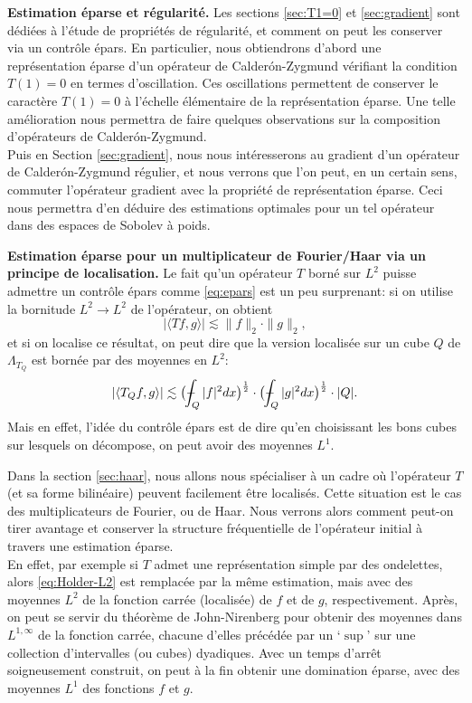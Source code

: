 \documentclass[11pt]{amsart}
\def\Xint#1{\mathchoice
   {\XXint\displaystyle\textstyle{#1}}%
   {\XXint\textstyle\scriptstyle{#1}}%
   {\XXint\scriptstyle\scriptscriptstyle{#1}}%
   {\XXint\scriptscriptstyle\scriptscriptstyle{#1}}%
   \!\int}
\def\XXint#1#2#3{{\setbox0=\hbox{$#1{#2#3}{\int}$}
     \vcenter{\hbox{$#2#3$}}\kern-.5\wd0}}
\def\aver#1{\Xint-_{#1}}
\begin{document}
\medskip

\large{ \bf Estimation \'eparse et r\'egularit\'e.}
Les sections \ref{sec:T1=0} et \ref{sec:gradient} sont d\'edi\'ees \`a l'\'etude de propri\'et\'es de r\'egularit\'e, et comment on peut les conserver via un contr\^ole \'epars. En particulier, nous obtiendrons d'abord une repr\'esentation \'eparse d'un op\'erateur de Calder\'on-Zygmund v\'erifiant la condition $T(1)=0$ en termes d'oscillation. Ces oscillations permettent de conserver le caract\`ere $T(1)=0$ \`a l'\'echelle \'el\'ementaire de la repr\'esentation \'eparse. Une telle am\'elioration nous permettra de faire quelques observations sur la composition d'op\'erateurs de Calder\'on-Zygmund. \\
Puis en Section \ref{sec:gradient}, nous nous int\'eresserons au gradient d'un op\'erateur de Calder\'on-Zygmund r\'egulier, et nous verrons que l'on peut, en un certain sens, commuter l'op\'erateur gradient avec la propri\'et\'e de repr\'esentation \'eparse. Ceci nous permettra d'en d\'eduire des estimations optimales pour un tel op\'erateur dans des espaces de Sobolev \`a poids.

\medskip

\large{ \bf Estimation \'eparse pour un multiplicateur de Fourier/Haar via un principe de localisation.}
Le fait qu'un op\'erateur $T$ born\'e sur $L^2$ puisse admettre un contr\^ole \'epars comme \eqref{eq:epars} est un peu surprenant: si on utilise la bornitude $L^2 \to L^2$ de l'op\'erateur, on  obtient
\[
\vert \langle T f, g  \rangle \vert \lesssim \|f\|_2 \cdot \|g\|_2,
\] 
et si on localise ce r\'esultat, on peut dire que la version localis\'ee sur un cube $Q$ de $\Lambda_{T_Q}$ est born\'ee par des moyennes en $L^2$:
\begin{equation}
\label{eq:Holder-L2}
\vert \langle T_{Q} f, g  \rangle \vert \lesssim \big(\aver{Q}\vert f \vert^2 dx\big)^{\frac{1}{2}} \cdot \big(\aver{Q}\vert g \vert^2 dx\big)^{\frac{1}{2}} \cdot \vert Q \vert.
\end{equation}
Mais en effet, l'id\'ee du contr\^ole \'epars est de dire qu'en choisissant les bons cubes sur lesquels on d\'ecompose, on peut avoir des moyennes $L^1$.

Dans la section \ref{sec:haar}, nous allons nous sp\'ecialiser \`a un cadre o\`u l'op\'erateur $T$ (et sa forme bilin\'eaire) peuvent facilement \^etre localis\'es. Cette situation est le cas des multiplicateurs de Fourier, ou de Haar. Nous verrons alors comment peut-on tirer avantage et conserver la structure {fr\'equentielle} de l'op\'erateur initial \`a travers une estimation \'eparse. \\
En effet, par exemple si $T$ admet une repr\'esentation simple par des ondelettes, alors \eqref{eq:Holder-L2} est remplac\'ee par la m\^eme estimation, mais avec des moyennes $L^2$ de la fonction carr\'ee (localis\'ee) de $f$ et de $g$, respectivement. Apr\`es, on peut se servir du th\'eor\`eme de John-Nirenberg pour obtenir des moyennes dans $L^{1, \infty}$ de la fonction carr\'ee, chacune d'elles pr\'ec\'ed\'ee par un `$\sup$' sur une collection d'intervalles (ou cubes) dyadiques. Avec un temps d'arr\^et soigneusement construit, on peut \`a la fin obtenir une domination \'eparse, avec des moyennes $L^1$ des fonctions $f$ et $g$.  
\end{document}
